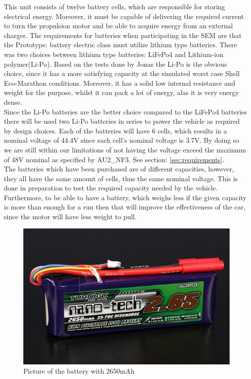 This unit consists of twelve battery cells, which are responsible for storing electrical energy. Moreover, it must be capable of delivering the required current to turn the propulsion motor and be able to acquire energy from an external charger.   
The requirements for batteries when participating in the SEM are that the Prototype: battery electric class must utilize lithium type batteries. There was two choices between lithium type batteries: LiFePo4 and Lithium-ion polymer(Li-Po). Based on the tests done by Jonas \cite{BMSBatteryTest} the Li-Po is the obvious choice, since it has a more satisfying capacity at the simulated worst case Shell Eco-Marathon conditions. Moreover, it has a solid low internal resistance and weight for the purpose, whilst it can pack a lot of energy, alas it is very energy dense.  \\
Since the Li-Po batteries are the better choice compared to the LiFePo4 batteries there will be used two Li-Po batteries in series to power the vehicle as required by design choices. Each of the batteries will have 6 cells, which results in a nominal voltage of 44.4V since each cell's nominal voltage is 3.7V. By doing so we are still within our limitations of not having the voltage exceed the maximum of 48V nominal as specified by AU2\_NF3. See section: \vref{sec:requirements}.\\
The batteries which have been purchased are of different capacities, however, they all have the same amount of cells, thus the same nominal voltage. This is done in preparation to test the required capacity needed by the vehicle. Furthermore, to be able to have a battery, which weighs less if the given capacity is more than enough for a run then that will improve the effectiveness of the car, since the motor will have less weight to pull.\\

\begin{figure}[H]
	\centering
	\includegraphics[width=0.6\linewidth]{Hardware/Pictures/2650battery}
	\caption[Empty]{Picture of the battery with 2650mAh\footnotemark}
	\label{fig:2650battery}
\end{figure}

